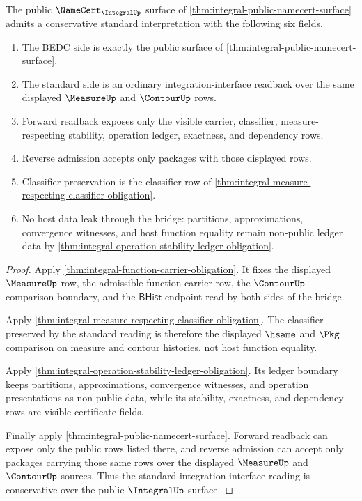 \begin{theorem}\label{thm:integral-conservative-standard-bridge}
The public $\NameCert_{\IntegralUp}$ surface of \autoref{thm:integral-public-namecert-surface} admits a conservative standard interpretation with the following six fields.
\begin{enumerate}
  \item The BEDC side is exactly the public surface of \autoref{thm:integral-public-namecert-surface}.
  \item The standard side is an ordinary integration-interface readback over the same displayed $\MeasureUp$ and $\ContourUp$ rows.
  \item Forward readback exposes only the visible carrier, classifier, measure-respecting stability, operation ledger, exactness, and dependency rows.
  \item Reverse admission accepts only packages with those displayed rows.
  \item Classifier preservation is the classifier row of \autoref{thm:integral-measure-respecting-classifier-obligation}.
  \item No host data leak through the bridge: partitions, approximations, convergence witnesses, and host function equality remain non-public ledger data by \autoref{thm:integral-operation-stability-ledger-obligation}.
\end{enumerate}
\end{theorem}
\begin{proof}
Apply \autoref{thm:integral-function-carrier-obligation}. It fixes the displayed $\MeasureUp$ row, the admissible function-carrier row, the $\ContourUp$ comparison boundary, and the $\mathsf{BHist}$ endpoint read by both sides of the bridge.

Apply \autoref{thm:integral-measure-respecting-classifier-obligation}. The classifier preserved by the standard reading is therefore the displayed $\hsame$ and $\Pkg$ comparison on measure and contour histories, not host function equality.

Apply \autoref{thm:integral-operation-stability-ledger-obligation}. Its ledger boundary keeps partitions, approximations, convergence witnesses, and operation presentations as non-public data, while its stability, exactness, and dependency rows are visible certificate fields.

Finally apply \autoref{thm:integral-public-namecert-surface}. Forward readback can expose only the public rows listed there, and reverse admission can accept only packages carrying those same rows over the displayed $\MeasureUp$ and $\ContourUp$ sources. Thus the standard integration-interface reading is conservative over the public $\IntegralUp$ surface.
\end{proof}

